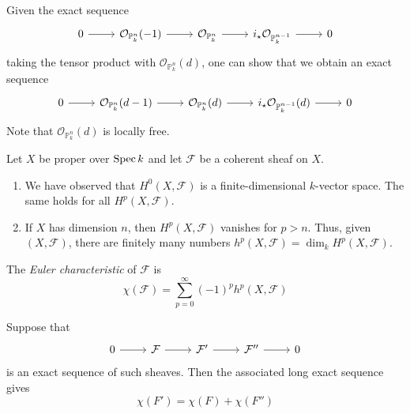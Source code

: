 Given the exact sequence
\[\begin{tikzcd}
	0 & {\mathcal O_{\mathbb P^n_k}(-1)} & {\mathcal O_{\mathbb P^n_k}} & {i_\star \mathcal O_{\mathbb P^{n-1}_k}} & 0
	\arrow[from=1-1, to=1-2]
	\arrow[from=1-2, to=1-3]
	\arrow[from=1-3, to=1-4]
	\arrow[from=1-4, to=1-5]
\end{tikzcd}\]
taking the tensor product with \( \mathcal O_{\mathbb P^n_k}(d) \), one can show that we obtain an exact sequence
\[\begin{tikzcd}
	0 & {\mathcal O_{\mathbb P^n_k}(d-1)} & {\mathcal O_{\mathbb P^n_k}(d)} & {i_\star \mathcal O_{\mathbb P^{n-1}_k}(d)} & 0
	\arrow[from=1-1, to=1-2]
	\arrow[from=1-2, to=1-3]
	\arrow[from=1-3, to=1-4]
	\arrow[from=1-4, to=1-5]
\end{tikzcd}\]
Note that \( \mathcal O_{\mathbb P^n_k}(d) \) is locally free.

Let \( X \) be proper over \( \operatorname{Spec} k \) and let \( \mathcal F \) be a coherent sheaf on \( X \).
\begin{remark}
	\begin{enumerate}
		\item We have observed that \( H^0(X, \mathcal F) \) is a finite-dimensional \( k \)-vector space.
		The same holds for all \( H^p(X, \mathcal F) \).
		\item If \( X \) has dimension \( n \), then \( H^p(X, \mathcal F) \) vanishes for \( p > n \).
		Thus, given \( (X, \mathcal F) \), there are finitely many numbers \( h^p(X, \mathcal F) = \dim_k H^p(X, \mathcal F) \).
	\end{enumerate}
\end{remark}
\begin{definition}
	The \emph{Euler characteristic} of \( \mathcal F \) is
	\[ \chi(\mathcal F) = \sum_{p = 0}^\infty (-1)^p h^p(X, \mathcal F) \]
\end{definition}
Suppose that
\[\begin{tikzcd}
	0 & {\mathcal F} & {\mathcal F'} & {\mathcal F''} & 0
	\arrow[from=1-1, to=1-2]
	\arrow[from=1-2, to=1-3]
	\arrow[from=1-3, to=1-4]
	\arrow[from=1-4, to=1-5]
\end{tikzcd}\]
is an exact sequence of such sheaves.
Then the associated long exact sequence gives
\[ \chi(F') = \chi(F) + \chi(F'') \]

